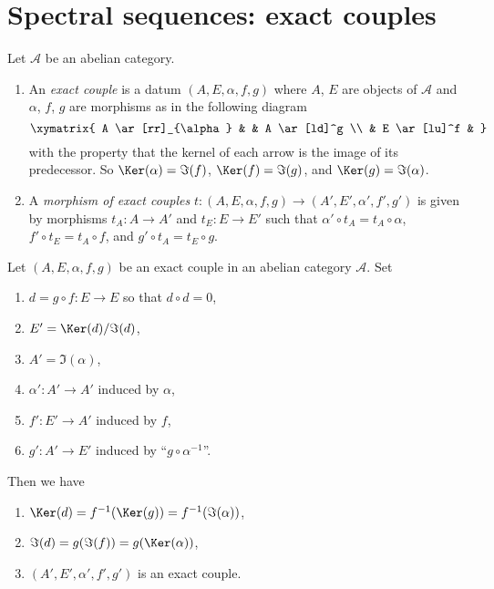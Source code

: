 \section{Spectral sequences: exact couples}
\label{section-exact-couple}

\begin{definition}
\label{definition-exact-couple}
Let $\mathcal{A}$ be an abelian category.
\begin{enumerate}
\item An {\it exact couple} is a datum $(A, E, \alpha, f, g)$ where
$A$, $E$ are objects of $\mathcal{A}$ and $\alpha$, $f$, $g$
are morphisms as in the following diagram
$$
\xymatrix{
A \ar[rr]_{\alpha} & & A \ar[ld]^g \\
& E \ar[lu]^f &
}
$$
with the property that the kernel of each arrow is the image
of its predecessor. So $\Ker(\alpha) = \Im(f)$,
$\Ker(f) = \Im(g)$, and $\Ker(g) = \Im(\alpha)$.
\item A {\it morphism of exact couples}
$t : (A, E, \alpha, f, g) \to (A', E', \alpha', f', g')$
is given by morphisms $t_A : A \to A'$ and
$t_E : E \to E'$ such that
$\alpha' \circ t_A = t_A \circ \alpha$,
$f' \circ t_E = t_A \circ f$, and
$g' \circ t_A = t_E \circ g$.
\end{enumerate}
\end{definition}

\begin{lemma}
\label{lemma-derived-exact-couple}
Let $(A, E, \alpha, f, g)$ be an exact couple in an abelian category
$\mathcal{A}$. Set
\begin{enumerate}
\item $d = g \circ f : E \to E$ so that $d \circ d = 0$,
\item $E' = \Ker(d)/\Im(d)$,
\item $A' = \Im(\alpha)$,
\item $\alpha' : A' \to A'$ induced by $\alpha$,
\item $f' : E' \to A'$ induced by $f$,
\item $g' : A' \to E'$ induced by ``$g \circ \alpha^{-1}$''.
\end{enumerate}
Then we have
\begin{enumerate}
\item $\Ker(d) = f^{-1}(\Ker(g)) = f^{-1}(\Im(\alpha))$,
\item $\Im(d) = g(\Im(f)) = g(\Ker(\alpha))$,
\item $(A', E', \alpha', f', g')$ is an exact couple.
\end{enumerate}
\end{lemma}

